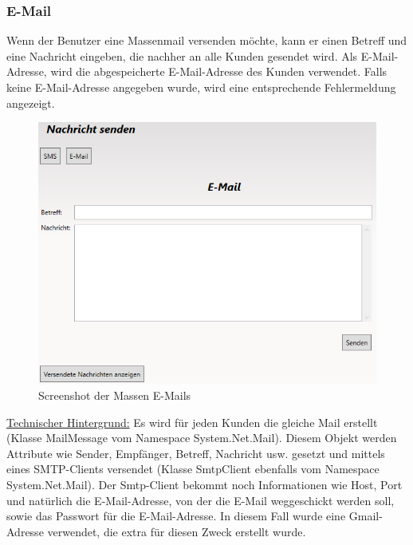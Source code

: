 \subsubsection{E-Mail}
Wenn der Benutzer eine Massenmail versenden möchte, kann er einen Betreff und eine Nachricht eingeben, die nachher an alle Kunden gesendet wird. Als E-Mail-Adresse, wird die abgespeicherte E-Mail-Adresse des Kunden verwendet. Falls keine E-Mail-Adresse angegeben wurde, wird eine entsprechende Fehlermeldung angezeigt.

\begin{figure}[H]
\begin{center}
	\includegraphics[scale=.45]{images/Massenemail.png}
\end{center}
	\caption{Screenshot der Massen E-Mails}
	\label{fig:sample}
\end{figure}
\noindent\underline{Technischer Hintergrund:}
\linebreak
Es wird für jeden Kunden die gleiche Mail erstellt (Klasse MailMessage vom Namespace System.Net.Mail). Diesem Objekt werden Attribute wie Sender, Empfänger, Betreff, Nachricht usw. gesetzt und mittels eines SMTP-Clients versendet (Klasse SmtpClient ebenfalls vom Namespace System.Net.Mail). Der Smtp-Client bekommt noch Informationen wie Host, Port und natürlich die E-Mail-Adresse, von der die E-Mail weggeschickt werden soll, sowie das Passwort für die E-Mail-Adresse. In diesem Fall wurde eine Gmail-Adresse verwendet, die extra für diesen Zweck erstellt wurde.

